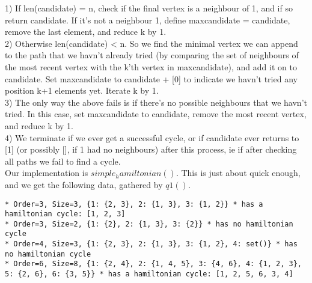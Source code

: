 \documentclass[10pt,a4paper]{report}
\begin{document}
1) If len(candidate) = n, check if the final vertex is a neighbour of 1, and if so return candidate. If it's not a neighbour 1, define maxcandidate = candidate, remove the last element, and reduce k by 1.\\

2) Otherwise len(candidate) < n. So we find the minimal vertex we can append to the path that we havn't already tried (by comparing the set of neighbours of the most recent vertex with the k'th vertex in maxcandidate), and add it on to candidate. Set maxcandidate to candidate + [0] to indicate we havn't tried any position k+1 elements yet. Iterate k by 1.\\

3) The only way the above fails is if there's no possible neighbours that we havn't tried. In this case, set maxcandidate to candidate, remove the most recent vertex, and reduce k by 1. \\

4) We terminate if we ever get a successful cycle, or if candidate ever returns to [1] (or possibly [], if 1 had no neighbours) after this process, ie if after checking all paths we fail to find a cycle. \\

Our implementation is $simple_hamiltonian()$. This is just about quick enough, and we get the following data, gathered by $q1()$. 

\begin{lstlisting}[breaklines]
* Order=3, Size=3, {1: {2, 3}, 2: {1, 3}, 3: {1, 2}} * has a hamiltonian cycle: [1, 2, 3]
* Order=3, Size=2, {1: {2}, 2: {1, 3}, 3: {2}} * has no hamiltonian cycle
* Order=4, Size=3, {1: {2, 3}, 2: {1, 3}, 3: {1, 2}, 4: set()} * has no hamiltonian cycle
* Order=6, Size=8, {1: {2, 4}, 2: {1, 4, 5}, 3: {4, 6}, 4: {1, 2, 3}, 5: {2, 6}, 6: {3, 5}} * has a hamiltonian cycle: [1, 2, 5, 6, 3, 4]
\end{lstlisting}
\end{document}
